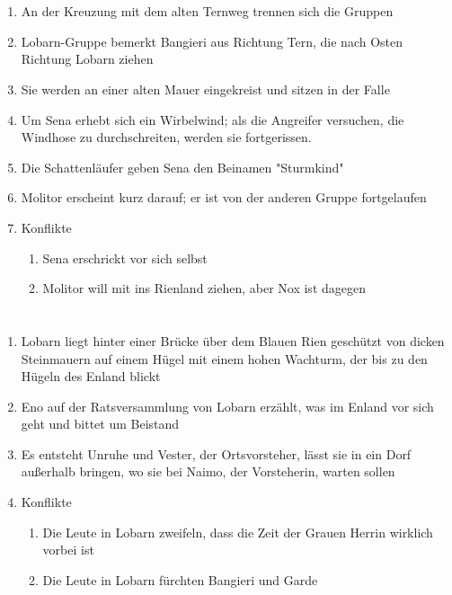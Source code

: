 \documentclass[12pt,a4paper,onecolumn,twoside,ngerman]{book}
\newcommand{\Tern}{Tern}
\newcommand{\Molitor}{Molitor}
\newcommand{\Ternweg}{{\Tern}weg}
\newcommand{\Sena}{Sena}
\newcommand{\Sturmkind}{Sturmkind}
\newcommand{\Bangiri}{Bangieri}
\newcommand{\Enland}{Enland}
\newcommand{\Schattenlaufer}{Schattenläufer}
\newcommand{\Eno}{Eno}
\newcommand{\Nox}{Nox}
\newcommand{\Lobarn}{Lobarn}
\newcommand{\Vester}{Vester}
\newcommand{\Naimo}{Naimo}
\newcommand{\Rhinland}{Rienland}
\newcommand{\Rhin}{Rien}
\begin{document}
\section[Der Weg nach Norden]{}
\begin{enumerate}
  \item An der Kreuzung mit dem alten {\Ternweg} trennen sich die Gruppen
  \item {\Lobarn}-Gruppe bemerkt {\Bangiri} aus Richtung {\Tern}, die nach Osten Richtung {\Lobarn} ziehen
  \item Sie werden an einer alten Mauer eingekreist und sitzen in der Falle
  \item Um {\Sena} erhebt sich ein Wirbelwind; als die Angreifer versuchen, die Windhose zu durchschreiten, werden sie fortgerissen. 
  \item Die {\Schattenlaufer} geben {\Sena} den Beinamen "{\Sturmkind}"
  \item {\Molitor} erscheint kurz darauf; er ist von der anderen Gruppe fortgelaufen
  \item Konflikte
  \begin{enumerate}
    \item {\Sena} erschrickt vor sich selbst
    \item {\Molitor} will mit ins {\Rhinland} ziehen, aber {\Nox} ist dagegen
  \end{enumerate}
\end{enumerate}

\section[Neuigkeiten]{}
\begin{enumerate}
  \item {\Lobarn} liegt hinter einer Brücke über dem Blauen {\Rhin} geschützt von dicken Steinmauern auf einem Hügel mit einem hohen Wachturm, der bis zu den Hügeln des {\Enland} blickt
  \item {\Eno} auf der Ratsversammlung von {\Lobarn} erzählt, was im {\Enland} vor sich geht und bittet um Beistand
  \item Es entsteht Unruhe und {\Vester}, der Ortsvorsteher, lässt sie in ein Dorf außerhalb bringen, wo sie bei {\Naimo}, der Vorsteherin, warten sollen
  \item Konflikte
  \begin{enumerate}
    \item Die Leute in {\Lobarn} zweifeln, dass die Zeit der Grauen Herrin wirklich vorbei ist
    \item Die Leute in {\Lobarn} fürchten {\Bangiri} und Garde
  \end{enumerate}
\end{enumerate}
\end{document}
